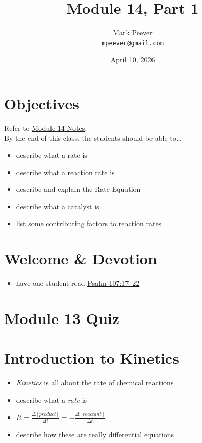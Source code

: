 \documentclass[10pt, oneside]{article}   	%
\title{Module 14, Part 1}
\author{Mark Peever\\ \texttt{mpeever@gmail.com}}
\date{April 10, 2026}
\begin{document}
\maketitle

\section*{Objectives}
Refer to \href{https://drive.google.com/file/d/1Bxe0uxWzNG95BBQg0zQ9IEhdGUAHYCXS/view?usp=sharing}{Module 14 Notes}.\\

By the end of this class, the students should be able to\ldots
\begin{itemize}
\item describe what a rate is
\item describe what a reaction rate is
\item describe and explain the Rate Equation
\item describe what a catalyst is
\item list some contributing factors to reaction rates
\end{itemize}

\section*{Welcome \& Devotion}
\begin{itemize}
\item have one student read \href{https://www.biblegateway.com/passage/?search=psalm\%20107\&version=LSB}{Psalm 107:17--22}
\end{itemize}


\section*{Module 13 Quiz}


\section*{Introduction to Kinetics}

\begin{itemize}
\item \emph{Kinetics}  is all about the rate of chemical reactions
\item describe what a \emph{rate} is
\item $R = \frac{\Delta [product]}{\Delta t} = - \frac{\Delta [reactant]}{\Delta t}$
\item describe how these are really differential equations 
\end{itemize}
\end{document}
